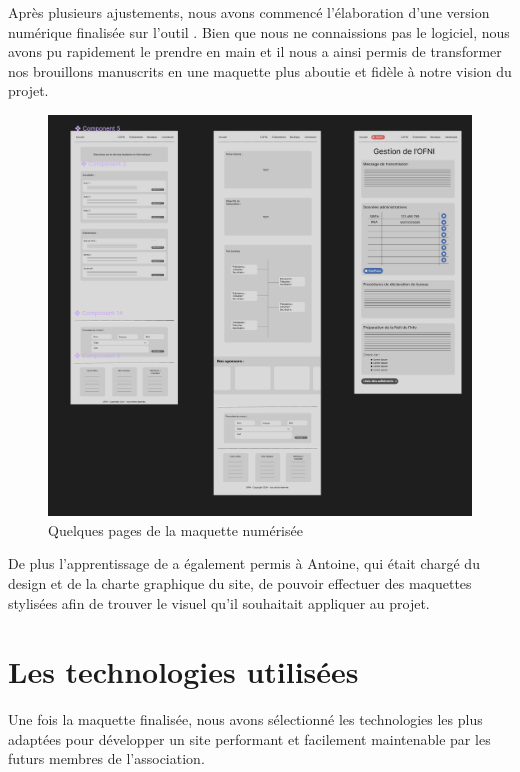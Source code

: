 Après plusieurs ajustements, nous
avons commencé l'élaboration d'une version numérique finalisée sur l'outil .
Bien que nous ne connaissions pas le logiciel, nous avons pu rapidement le prendre en main et il nous a ainsi permis de transformer nos brouillons manuscrits en une maquette plus aboutie et fidèle à notre vision du projet.

\begin{figure}[H]
    \centering
    \includegraphics[scale=0.4]{assets/pictures/figma.png}
    \caption{Quelques pages de la maquette numérisée}
    \label{fig:maquette-figma}
\end{figure}

De plus l'apprentissage de  a également permis à Antoine, qui était chargé du design et de la charte graphique du site, de pouvoir effectuer des maquettes stylisées afin de trouver le visuel qu'il souhaitait appliquer au projet.

\section{Les technologies utilisées}
\label{sec:technologies-utilisees}

Une fois la maquette finalisée, nous avons sélectionné les technologies les plus adaptées pour développer un site performant et facilement maintenable par les futurs membres de l’association.

